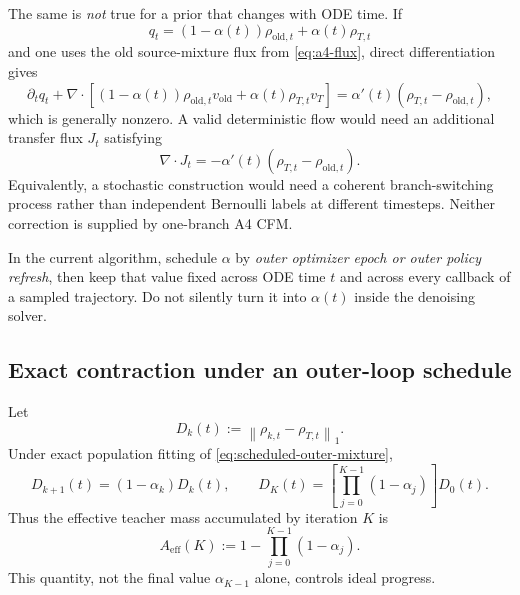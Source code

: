 \documentclass[11pt,a4paper]{article}
\newcommand{\norm}[1]{\left\lVert #1 \right\rVert}
\newcommand{\vold}{v_{\mathrm{old}}}
\newcommand{\vT}{v_T}
\theoremstyle{plain}
\theoremstyle{definition}
\begin{document}
The same is \emph{not} true for a prior that changes with ODE time.  If
\[
q_t=(1-\alpha(t))\rho_{\mathrm{old},t}+\alpha(t)\rho_{T,t}
\]
and one uses the old source-mixture flux from \eqref{eq:a4-flux}, direct differentiation gives
\begin{equation}
\partial_tq_t+
\nabla\!\cdot\left[
  (1-\alpha(t))\rho_{\mathrm{old},t}\vold
  +\alpha(t)\rho_{T,t}\vT
\right]
=
\alpha'(t)\left(\rho_{T,t}-\rho_{\mathrm{old},t}\right),
\label{eq:time-alpha-continuity-defect}
\end{equation}
which is generally nonzero.  A valid deterministic flow would need an additional transfer flux
$J_t$ satisfying
\begin{equation}
\nabla\!\cdot J_t
=-\alpha'(t)\left(\rho_{T,t}-\rho_{\mathrm{old},t}\right).
\label{eq:time-alpha-transfer-flux}
\end{equation}
Equivalently, a stochastic construction would need a coherent branch-switching process rather
than independent Bernoulli labels at different timesteps.  Neither correction is supplied by
one-branch A4 CFM.

\begin{tcolorbox}[colback=yellow!6,colframe=yellow!55!black,title=Safe meaning of a dynamic teacher weight]
In the current algorithm, schedule $\alpha$ by \emph{outer optimizer epoch or outer policy
refresh}, then keep that value fixed across ODE time $t$ and across every callback of a sampled
trajectory.  Do not silently turn it into $\alpha(t)$ inside the denoising solver.
\end{tcolorbox}

\subsection{Exact contraction under an outer-loop schedule}

Let
\begin{equation}
D_k(t):=\norm{\rho_{k,t}-\rho_{T,t}}_1.
\end{equation}
Under exact population fitting of \eqref{eq:scheduled-outer-mixture},
\begin{equation}
D_{k+1}(t)
=(1-\alpha_k)D_k(t),
\qquad
D_K(t)
=
\left[\prod_{j=0}^{K-1}(1-\alpha_j)\right]D_0(t).
\label{eq:scheduled-contraction}
\end{equation}
Thus the effective teacher mass accumulated by iteration $K$ is
\begin{equation}
A_{\mathrm{eff}}(K)
:=
1-\prod_{j=0}^{K-1}(1-\alpha_j).
\label{eq:effective-teacher-mass}
\end{equation}
This quantity, not the final value $\alpha_{K-1}$ alone, controls ideal progress.
\end{document}
